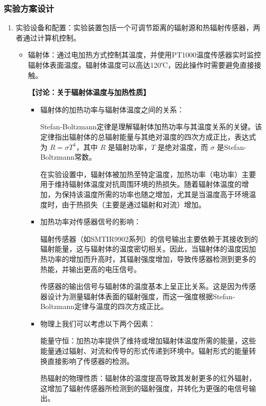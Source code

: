 \documentclass[dvipsnames, svgnames,a4paper,11pt]{article}
\begin{document}
	\subsubsection{实验方案设计}
	\begin{enumerate}
		\item 实验设备和配置：实验装置包括一个可调节距离的辐射源和热辐射传感器，两者通过计算机控制。
		
		\begin{itemize}
			\item 辐射体：通过电加热方式控制其温度，并使用PT1000温度传感器实时监控辐射体表面温度。辐射体温度可以高达120℃，因此操作时需要避免直接接触。
			
			\quad
			
			\textbf{【讨论：关于辐射体温度与加热性质】}
			\begin{itemize}
				\item 辐射体的加热功率与辐射体温度之间的关系：
				
				Stefan-Boltzmann定律是理解辐射体加热功率与其温度关系的关键。该定律指出辐射体的总辐射能量与其绝对温度的四次方成正比，表达式为 \( R = \sigma T^4 \)，其中 \( R \) 是辐射功率，\( T \) 是绝对温度，而 \( \sigma \) 是Stefan-Boltzmann常数。
				
				在实验设置中，辐射体被加热至特定温度，加热功率（电功率）主要用于维持辐射体温度对抗周围环境的热损失。随着辐射体温度的增加，为保持该温度所需的功率也随之增加，尤其是当温度高于环境温度时，由于热损失（主要是通过辐射和对流）增加。
				
				\item 加热功率对传感器信号的影响：
				
				辐射传感器（如SMTIR9902系列）的信号输出主要依赖于其接收到的辐射能量，这与辐射体的温度密切相关。因此，当辐射体的温度因加热功率的增加而升高时，其辐射强度增加，导致传感器检测到更多的热能，并输出更高的电压信号。
				
				传感器的输出信号与辐射体的温度基本上呈正比关系。这是因为传感器设计为测量辐射体表面的辐射强度，而这一强度根据Stefan-Boltzmann定律与温度的四次方成正比。
				
				\item 物理上我们可以考虑以下两个因素：
				
				能量守恒：加热功率提供了维持或增加辐射体温度所需的能量，这些能量通过辐射、对流和传导的形式传递到环境中。辐射形式的能量转换直接影响了传感器的检测。
				
				热辐射的物理性质：辐射体的温度提高导致其发射更多的红外辐射，这增加了辐射传感器所检测到的辐射强度，并转化为更强的电信号输出。
			\end{itemize}
			

\end{itemize}
\end{enumerate}
\end{document}
